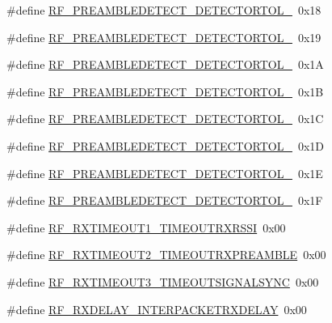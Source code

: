 \begin{DoxyCompactItemize}
\#define \mbox{\hyperlink{sx1276_regs-_fsk_8h_aef7179fc37f80c1dcf77e12ebafa1b50}{R\+F\+\_\+\+P\+R\+E\+A\+M\+B\+L\+E\+D\+E\+T\+E\+C\+T\+\_\+\+D\+E\+T\+E\+C\+T\+O\+R\+T\+O\+L\+\_}}~0x18
\item 
\#define \mbox{\hyperlink{sx1276_regs-_fsk_8h_ab5b2d80ff0b029a3de2dd04b83fc4313}{R\+F\+\_\+\+P\+R\+E\+A\+M\+B\+L\+E\+D\+E\+T\+E\+C\+T\+\_\+\+D\+E\+T\+E\+C\+T\+O\+R\+T\+O\+L\+\_}}~0x19
\item 
\#define \mbox{\hyperlink{sx1276_regs-_fsk_8h_ab588e51e9deb46dc1349326566bde157}{R\+F\+\_\+\+P\+R\+E\+A\+M\+B\+L\+E\+D\+E\+T\+E\+C\+T\+\_\+\+D\+E\+T\+E\+C\+T\+O\+R\+T\+O\+L\+\_}}~0x1A
\item 
\#define \mbox{\hyperlink{sx1276_regs-_fsk_8h_a73aa24ae139867b133532a5c8c0be09f}{R\+F\+\_\+\+P\+R\+E\+A\+M\+B\+L\+E\+D\+E\+T\+E\+C\+T\+\_\+\+D\+E\+T\+E\+C\+T\+O\+R\+T\+O\+L\+\_}}~0x1B
\item 
\#define \mbox{\hyperlink{sx1276_regs-_fsk_8h_ad119978aa14dfd4d1505c29a6732c11e}{R\+F\+\_\+\+P\+R\+E\+A\+M\+B\+L\+E\+D\+E\+T\+E\+C\+T\+\_\+\+D\+E\+T\+E\+C\+T\+O\+R\+T\+O\+L\+\_}}~0x1C
\item 
\#define \mbox{\hyperlink{sx1276_regs-_fsk_8h_aae822debf5d31da445ec5836bd6c293b}{R\+F\+\_\+\+P\+R\+E\+A\+M\+B\+L\+E\+D\+E\+T\+E\+C\+T\+\_\+\+D\+E\+T\+E\+C\+T\+O\+R\+T\+O\+L\+\_}}~0x1D
\item 
\#define \mbox{\hyperlink{sx1276_regs-_fsk_8h_a909bc72cec5165d5a6374b88b5d3ea6a}{R\+F\+\_\+\+P\+R\+E\+A\+M\+B\+L\+E\+D\+E\+T\+E\+C\+T\+\_\+\+D\+E\+T\+E\+C\+T\+O\+R\+T\+O\+L\+\_}}~0x1E
\item 
\#define \mbox{\hyperlink{sx1276_regs-_fsk_8h_a0c05079f0ba1fe02406808d156d78937}{R\+F\+\_\+\+P\+R\+E\+A\+M\+B\+L\+E\+D\+E\+T\+E\+C\+T\+\_\+\+D\+E\+T\+E\+C\+T\+O\+R\+T\+O\+L\+\_}}~0x1F
\item 
\#define \mbox{\hyperlink{sx1276_regs-_fsk_8h_aac1596be27776611ff5936e308cdb900}{R\+F\+\_\+\+R\+X\+T\+I\+M\+E\+O\+U\+T1\+\_\+\+T\+I\+M\+E\+O\+U\+T\+R\+X\+R\+S\+SI}}~0x00
\item 
\#define \mbox{\hyperlink{sx1276_regs-_fsk_8h_a28172a613ca2fd8925df8b1722bf58ea}{R\+F\+\_\+\+R\+X\+T\+I\+M\+E\+O\+U\+T2\+\_\+\+T\+I\+M\+E\+O\+U\+T\+R\+X\+P\+R\+E\+A\+M\+B\+LE}}~0x00
\item 
\#define \mbox{\hyperlink{sx1276_regs-_fsk_8h_aaee5dfb33a404f5cbdba0a317cb45907}{R\+F\+\_\+\+R\+X\+T\+I\+M\+E\+O\+U\+T3\+\_\+\+T\+I\+M\+E\+O\+U\+T\+S\+I\+G\+N\+A\+L\+S\+Y\+NC}}~0x00
\item 
\#define \mbox{\hyperlink{sx1276_regs-_fsk_8h_a3e60ee872c200009c326412fbc4a84c8}{R\+F\+\_\+\+R\+X\+D\+E\+L\+A\+Y\+\_\+\+I\+N\+T\+E\+R\+P\+A\+C\+K\+E\+T\+R\+X\+D\+E\+L\+AY}}~0x00

\end{DoxyCompactItemize}
